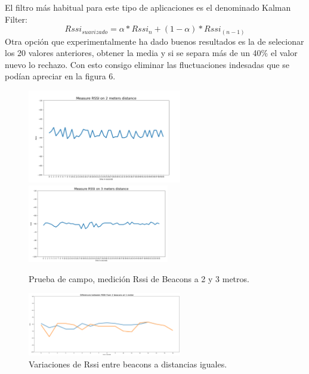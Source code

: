 \documentclass[paper=a4, fontsize=11pt,twoside]{scrartcl}	%
\begin{document}
            El filtro más habitual para este tipo de aplicaciones es el denominado Kalman Filter:
            \begin{equation}
                Rssi_{suavizado} = \alpha * Rssi_{n} + (1-\alpha) * Rssi_{(n-1)}
            \end{equation}
            Otra opción que experimentalmente ha dado buenos resultados es la de selecionar los 20 valores anteriores,
            obtener la media y si se separa más de un 40\% el valor nuevo lo rechazo. Con esto consigo eliminar las 
            fluctuaciones indesadas que se podían apreciar en la figura 6.
            \begin{center}
                \begin{figure}[ht]
                    \centering
                    \includegraphics[width=0.6\textwidth]{1_beacon_2_meters.PNG}
                    \includegraphics[width=0.55\textwidth]{1_beacon_3_meters.PNG}
                    \caption{Prueba de campo, medición Rssi de Beacons a 2 y 3 metros.}
                    \label{fig:mesh5}
                \end{figure}
            \end{center}
            \begin{center}
                \begin{figure}[ht]
                    \centering
                    \includegraphics[width=0.6\textwidth]{10min_2beacons_same_distance.PNG}
                    \caption{Variaciones de Rssi entre beacons a distancias iguales.}
                    \label{fig:mesh6}
                \end{figure}
            \end{center}
\end{document}
